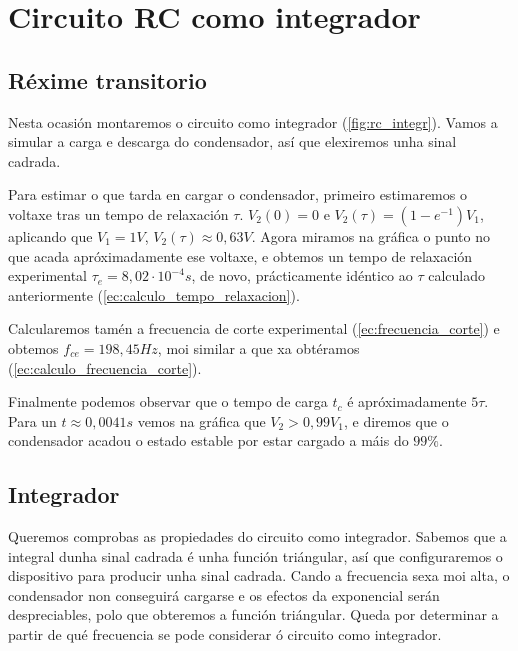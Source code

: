 \documentclass[12pt, a4paper, titlepage]{article}
\begin{document}
    \vspace{36pt}
    
    \section{Circuito RC como integrador}

    \subsection{Réxime transitorio}

    Nesta ocasión montaremos o circuito como integrador (\ref{fig:rc_integr}).
    Vamos a simular a carga e descarga do condensador, así que elexiremos unha sinal cadrada.

    Para estimar o que tarda en cargar o condensador, primeiro estimaremos o voltaxe tras un tempo de relaxación $\tau$.
    $V_2(0) = 0$ e $V_2(\tau) = (1 - e^{-1})V_1$, aplicando que $V_1 = 1V$, $V_2(\tau) \approx 0,63V$.
    Agora miramos na gráfica o punto no que acada apróximadamente ese voltaxe, e obtemos un tempo de relaxación experimental $\tau_e = 8,02 \cdot 10^{-4} s$, de novo, prácticamente idéntico ao $\tau$ calculado anteriormente (\ref{ec:calculo_tempo_relaxacion}).

    Calcularemos tamén a frecuencia de corte experimental (\ref{ec:frecuencia_corte}) e obtemos $f_{ce} = 198,45 Hz$, moi similar a que xa obtéramos (\ref{ec:calculo_frecuencia_corte}).

    Finalmente podemos observar que o tempo de carga $t_c$ é apróximadamente $5\tau$. Para un $t \approx 0,0041s$ vemos na gráfica que $V_2 > 0,99 V_1$, e diremos que o condensador acadou o estado estable por estar cargado a máis do $99\%$.

    \begin{figure}[H]
      \hspace{2.6cm}
      \resizebox{20.5cm}{!}{}
    \end{figure}


    \subsection{Integrador}

    Queremos comprobas as propiedades do circuito como integrador. Sabemos que a integral dunha sinal cadrada é unha función triángular, así que configuraremos o dispositivo para producir unha sinal cadrada.
    Cando a frecuencia sexa moi alta, o condensador non conseguirá cargarse e os efectos da exponencial serán despreciables, polo que obteremos a función triángular.
    Queda por determinar a partir de qué frecuencia se pode considerar ó circuito como integrador.
\end{document}
